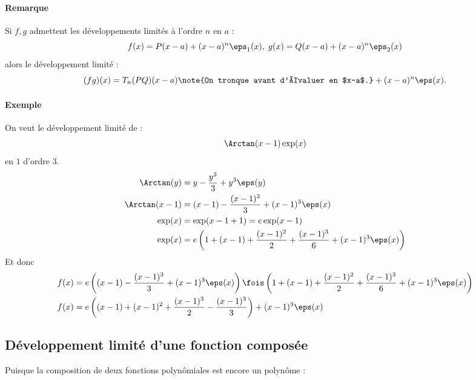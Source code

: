 \paragraph{Remarque}Si $f,g$ admettent les développements limités à l'ordre $n$ en $a$ : \[ f(x) = P(x-a) + (x-a)^{n}\eps_1(x), \; g(x) = Q(x-a) + (x-a)^{n} \eps_2(x)\]alors le développement limité : \[ (fg)(x)  = T_n(PQ)(x-a)\note{On tronque avant d'évaluer en $x-a$.} + (x-a)^{n}\eps(x). \]

\paragraph{Exemple}On veut le développement limité de : \[ \Arctan(x-1)\exp(x)\]en $1$ d'ordre $3$.
\begin{align*}
\Arctan(y) &= y - \frac{y^{3}}{3} +y^{3}\eps(y) \\ 
\Arctan(x-1) &= (x-1) - \frac{(x-1)^{3}}{3}+(x-1)^{3}\eps(x) \\
\exp(x) &= \exp(x-1+1) = e\exp(x-1) \\
\exp(x) &= e\left(  1 + (x-1) + \frac{(x-1)^{2}}{2} + \frac{(x-1)^{3}}{6} + (x-1)^{3}\eps(x)\right)
\end{align*}
Et donc 
\begin{align*}
f(x) &= e\left( (x-1) - \frac{(x-1)^{3}}{3} + (x-1)^{3}\eps(x) \right)\fois \left( 1 + (x-1) + \frac{(x-1)^{2}}{2} + \frac{(x-1)^{3}}{6} + (x-1)^{3}\eps(x) \right)\\
f(x) &= e\left( (x-1) + (x-1)^{2} + \frac{(x-1)^{3}}{2} - \frac{(x-1)^{3}}{3} \right) + (x-1)^{3}\eps(x)
\end{align*}

\subsection{Développement limité d'une fonction composée}
Puisque la composition de deux fonctions polynômiales est encore un polynôme :

